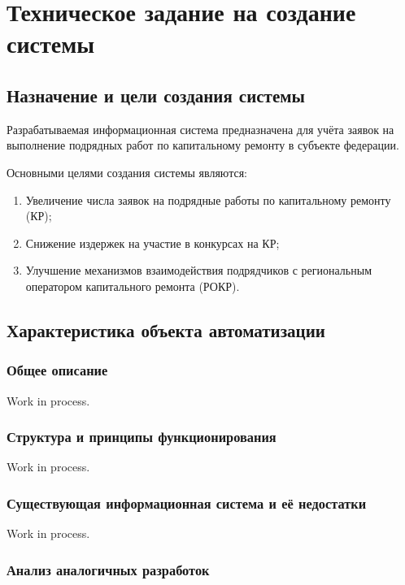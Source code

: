 \section{Техническое задание на создание системы}

\subsection{Назначение и цели создания системы}

Разрабатываемая информационная система предназначена для учёта заявок на выполнение подрядных работ по капитальному ремонту в субъекте федерации.

Основными целями создания системы являются:

\begin{enumerate}
	\item Увеличение числа заявок на подрядные работы по капитальному ремонту (КР);
	\item Снижение издержек на участие в конкурсах на КР;
	\item Улучшение механизмов взаимодействия подрядчиков с региональным оператором капитального ремонта (РОКР).
\end{enumerate}

\subsection{Характеристика объекта автоматизации}

\subsubsection{Общее описание}

Work in process.

\subsubsection{Структура и принципы функционирования}

Work in process.

\subsubsection{Существующая информационная система и её недостатки}

Work in process.

\subsubsection{Анализ аналогичных разработок}

